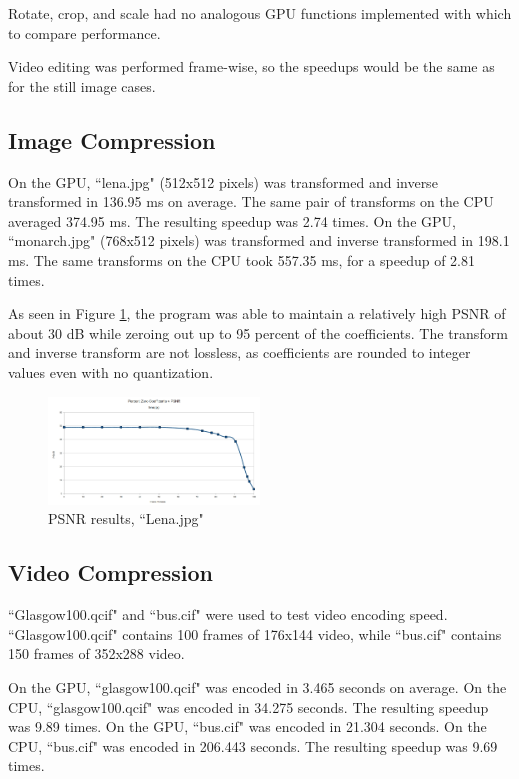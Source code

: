 \documentclass[10pt,twocolumn,twoside]{IEEEtran}
\begin{document}
Rotate, crop, and scale had no analogous GPU functions implemented with which to compare performance. 

Video editing was performed frame-wise, so the speedups would be the same as for the still image cases.

\subsection{Image Compression}
On the GPU, ``lena.jpg" (512x512 pixels) was transformed and inverse transformed in 136.95 ms on average. The same pair of transforms on the CPU averaged 374.95 ms. The resulting speedup was 2.74 times. On the GPU, ``monarch.jpg" (768x512 pixels) was transformed and inverse transformed in 198.1 ms. The same transforms on the CPU took 557.35 ms, for a speedup of 2.81 times.

As seen in Figure \ref{fig:lena_psnr}, the program was able to maintain a relatively high PSNR of about 30 dB while zeroing out up to 95 percent of the coefficients. The transform and inverse transform are not lossless, as coefficients are rounded to integer values even with no quantization.

\begin{figure}[htbp]
\begin{center}
\includegraphics[width=0.5\textwidth]{Images/lena_psnr_chart.jpg}
\caption{PSNR results, ``Lena.jpg"}
\label{fig:lena_psnr}
\end{center}
\end{figure}

\subsection{Video Compression}
``Glasgow100.qcif" and ``bus.cif" were used to test video encoding speed. ``Glasgow100.qcif" contains 100 frames of 176x144 video, while ``bus.cif" contains 150 frames of 352x288 video.

On the GPU, ``glasgow100.qcif" was encoded in 3.465 seconds on average. On the CPU, ``glasgow100.qcif" was encoded in 34.275 seconds. The resulting speedup was 9.89 times. On the GPU, ``bus.cif" was encoded in 21.304 seconds. On the CPU, ``bus.cif" was encoded in 206.443 seconds. The resulting speedup was 9.69 times.
\end{document}
